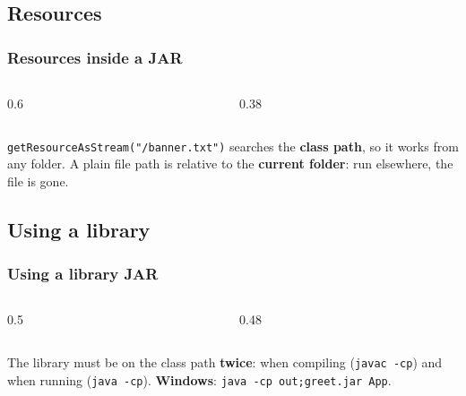\documentclass[aspectratio=169,10pt,compress]{beamer}
\newcommand{\win}{\textbf{Windows}}
\begin{document}
\subsection[Resources]{Resources}




\begin{frame}[t,fragile] \frametitle{Resources inside a JAR}
  \begin{columns}[T]
    \begin{column}{0.6\textwidth}
    \end{column}
    \begin{column}{0.38\textwidth}
    \end{column}
  \end{columns}

  \vspace{0.1em}
  \small \texttt{getResourceAsStream("/banner.txt")} searches the \textbf{class path}, so it works from any folder.
  A plain file path is relative to the \textbf{current folder}: run elsewhere, the file is gone.
\end{frame}

\subsection[Libraries]{Using a library}




\begin{frame}[t,fragile] \frametitle{Using a library JAR}
  \begin{columns}[T]
    \begin{column}{0.5\textwidth}
    \end{column}
    \begin{column}{0.48\textwidth}
    \end{column}
  \end{columns}
  \small The library must be on the class path \textbf{twice}: when compiling (\texttt{javac -cp}) and when running
  (\texttt{java -cp}). \win: \texttt{java -cp out;greet.jar App}.
\end{frame}
\end{document}
